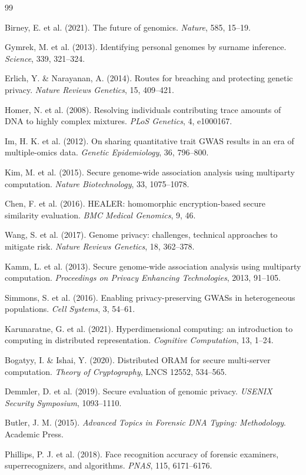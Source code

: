 \documentclass[11pt,letterpaper]{article}
\begin{document}
\begin{thebibliography}{99}

 Birney, E. et al. (2021). The future of genomics. \textit{Nature}, 585, 15--19.

 Gymrek, M. et al. (2013). Identifying personal genomes by surname inference. \textit{Science}, 339, 321--324.

 Erlich, Y. \& Narayanan, A. (2014). Routes for breaching and protecting genetic privacy. \textit{Nature Reviews Genetics}, 15, 409--421.

 Homer, N. et al. (2008). Resolving individuals contributing trace amounts of DNA to highly complex mixtures. \textit{PLoS Genetics}, 4, e1000167.

 Im, H. K. et al. (2012). On sharing quantitative trait GWAS results in an era of multiple-omics data. \textit{Genetic Epidemiology}, 36, 796--800.

 Kim, M. et al. (2015). Secure genome-wide association analysis using multiparty computation. \textit{Nature Biotechnology}, 33, 1075--1078.

 Chen, F. et al. (2016). HEALER: homomorphic encryption-based secure similarity evaluation. \textit{BMC Medical Genomics}, 9, 46.

 Wang, S. et al. (2017). Genome privacy: challenges, technical approaches to mitigate risk. \textit{Nature Reviews Genetics}, 18, 362--378.

 Kamm, L. et al. (2013). Secure genome-wide association analysis using multiparty computation. \textit{Proceedings on Privacy Enhancing Technologies}, 2013, 91--105.

 Simmons, S. et al. (2016). Enabling privacy-preserving GWASs in heterogeneous populations. \textit{Cell Systems}, 3, 54--61.

 Karunaratne, G. et al. (2021). Hyperdimensional computing: an introduction to computing in distributed representation. \textit{Cognitive Computation}, 13, 1--24.

 Bogatyy, I. \& Ishai, Y. (2020). Distributed ORAM for secure multi-server computation. \textit{Theory of Cryptography}, LNCS 12552, 534--565.

 Demmler, D. et al. (2019). Secure evaluation of genomic privacy. \textit{USENIX Security Symposium}, 1093--1110.

 Butler, J. M. (2015). \textit{Advanced Topics in Forensic DNA Typing: Methodology}. Academic Press.

 Phillips, P. J. et al. (2018). Face recognition accuracy of forensic examiners, superrecognizers, and algorithms. \textit{PNAS}, 115, 6171--6176.

\end{thebibliography}
\end{document}
